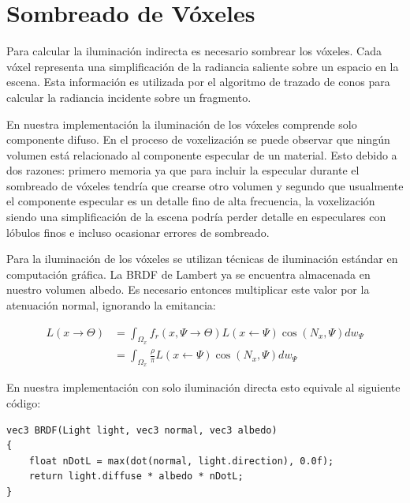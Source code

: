 \section{Sombreado de Vóxeles} %
\label{sec:sombreado_de_voxeles_impl}
Para calcular la iluminación indirecta es necesario sombrear los vóxeles. Cada vóxel representa una simplificación de la radiancia saliente sobre un espacio en la escena. Esta información es utilizada por el algoritmo de trazado de conos para calcular la radiancia incidente sobre un fragmento.

En nuestra implementación la iluminación de los vóxeles comprende solo componente difuso. En el proceso de voxelización se puede observar que ningún volumen está relacionado al componente especular de un material. Esto debido a dos razones: primero memoria ya que para incluir la especular durante el sombreado de vóxeles tendría que crearse otro volumen y segundo que usualmente el componente especular es un detalle fino de alta frecuencia, la voxelización siendo una simplificación de la escena podría perder detalle en especulares con lóbulos finos e incluso ocasionar errores de sombreado.

Para la iluminación de los vóxeles se utilizan técnicas de iluminación estándar en computación gráfica. La \ac{BRDF} de Lambert ya se encuentra almacenada en nuestro volumen albedo. Es necesario entonces multiplicar este valor por la atenuación normal, ignorando la emitancia:

\begin{equation}
	\begin{split}
		L(x\to\Theta) &= \int_{\Omega_{x}}{f_{r}(x, \Psi\to\Theta)L(x\gets\Psi)\cos(N_{x}, \Psi)dw_{\Psi}}\\
		&= \int_{\Omega_{x}}{\frac{\rho}{\pi}L(x\gets\Psi)\cos(N_{x}, \Psi)dw_{\Psi}}
	\end{split}
	\label{eq:shading_voxels}
\end{equation}

En nuestra implementación con solo iluminación directa esto equivale al siguiente código:
\\
\begin{lstlisting}[caption={Sombreado estándar para un vóxel}, label=Shading]
vec3 BRDF(Light light, vec3 normal, vec3 albedo)
{
	float nDotL = max(dot(normal, light.direction), 0.0f);
	return light.diffuse * albedo * nDotL;
}
\end{lstlisting}

